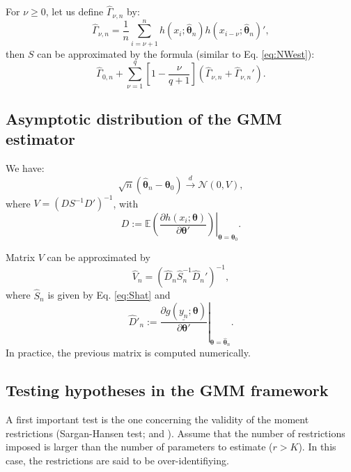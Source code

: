 \documentclass[
  12pt,
]{book}
\theoremstyle{definition}
\theoremstyle{definition}
\theoremstyle{definition}
\theoremstyle{definition}
\theoremstyle{remark}
\begin{document}
For \(\nu \ge 0\), let us define \(\hat{\Gamma}_{\nu,n}\) by:
\[
\hat{\Gamma}_{\nu,n} = \frac{1}{n} \sum_{i=\nu + 1}^{n} h(x_i;\hat{\boldsymbol\theta}_n)h(x_{i-\nu};\hat{\boldsymbol\theta}_n)',
\]
then \(S\) can be approximated by the \citet{Newey_West_1987} formula (similar to Eq. \eqref{eq:NWest}):
\begin{equation}
\hat{\Gamma}_{0,n} + \sum_{\nu=1}^{q}\left[1-\frac{\nu}{q+1}\right](\hat{\Gamma}_{\nu,n}+\hat{\Gamma}_{\nu,n}').    \label{eq:Shat}
\end{equation}

\hypertarget{asymptotic-distribution-of-the-gmm-estimator}{%
\subsection{Asymptotic distribution of the GMM estimator}\label{asymptotic-distribution-of-the-gmm-estimator}}

We have:
\begin{equation}
\boxed{\sqrt{n}(\hat{\boldsymbol\theta}_n - \boldsymbol\theta_0) \overset{d}{\rightarrow} \mathcal{N}(0,V),}\label{eq:asymptGMM}
\end{equation}
where \(V = (DS^{-1}D')^{-1}\), with
\[
D := \left.\mathbb{E}\left(\frac{\partial h(x_i;\boldsymbol\theta)}{\partial \boldsymbol\theta'}\right)\right|_{\boldsymbol\theta = \boldsymbol\theta_0}.
\]

Matrix \(V\) can be approximated by
\begin{equation}
\hat{V}_n = (\hat{D}_n\hat{S}_n^{-1}\hat{D}_n')^{-1},\label{eq:VGMM}
\end{equation}
where \(\hat{S}_n\) is given by Eq. \eqref{eq:Shat} and
\[
\hat{D}'_n := \left.\frac{\partial g(\underline{y_n};\boldsymbol\theta)}{\partial \boldsymbol\theta'}\right|_{\boldsymbol\theta = \hat{\boldsymbol\theta}_n}.
\]
In practice, the previous matrix is computed numerically.

\hypertarget{overidentif}{%
\subsection{Testing hypotheses in the GMM framework}\label{overidentif}}

A first important test is the one concerning the validity of the moment restrictions (Sargan-Hansen test; \citet{Sargan_1958} and \citet{Hansen_1982}). Assume that the number of restrictions imposed is larger than the number of parameters to estimate (\(r>K\)). In this case, the restrictions are said to be over-identifiying.
\end{document}
